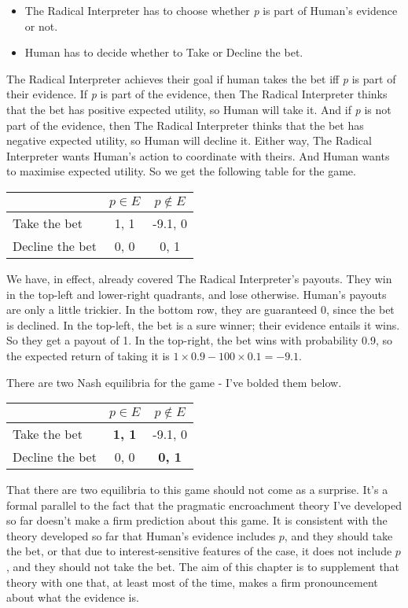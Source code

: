 \documentclass[11pt,]{book}
\providecommand{\tightlist}{%
  \setlength{\itemsep}{0pt}\setlength{\parskip}{0pt}}
\def\toprule{}
\def\bottomrule{}
\def\midrule{}
\begin{document}
\begin{itemize}
\tightlist
\item
  The Radical Interpreter has to choose whether \emph{p} is part of Human's evidence or not.
\item
  Human has to decide whether to Take or Decline the bet.
\end{itemize}

The Radical Interpreter achieves their goal if human takes the bet iff \emph{p} is part of their evidence. If \emph{p} is part of the evidence, then The Radical Interpreter thinks that the bet has positive expected utility, so Human will take it. And if \emph{p} is not part of the evidence, then The Radical Interpreter thinks that the bet has negative expected utility, so Human will decline it. Either way, The Radical Interpreter wants Human's action to coordinate with theirs. And Human wants to maximise expected utility. So we get the following table for the game.

\begin{longtable}[]{@{}lcc@{}}
\toprule
& \(p \in E\) & \(p \notin E\)\tabularnewline
\midrule
\endhead
Take the bet & 1, 1 & -9.1, 0\tabularnewline
Decline the bet & 0, 0 & 0, 1\tabularnewline
\bottomrule
\end{longtable}

We have, in effect, already covered The Radical Interpreter's payouts. They win in the top-left and lower-right quadrants, and lose otherwise. Human's payouts are only a little trickier. In the bottom row, they are guaranteed 0, since the bet is declined. In the top-left, the bet is a sure winner; their evidence entails it wins. So they get a payout of 1. In the top-right, the bet wins with probability 0.9, so the expected return of taking it is \(1 \times 0.9 - 100 \times 0.1 = -9.1\).

There are two Nash equilibria for the game - I've bolded them below.

\begin{longtable}[]{@{}lcc@{}}
\toprule
& \(p \in E\) & \(p \notin E\)\tabularnewline
\midrule
\endhead
Take the bet & \textbf{1, 1} & -9.1, 0\tabularnewline
Decline the bet & 0, 0 & \textbf{0, 1}\tabularnewline
\bottomrule
\end{longtable}

That there are two equilibria to this game should not come as a surprise. It's a formal parallel to the fact that the pragmatic encroachment theory I've developed so far doesn't make a firm prediction about this game. It is consistent with the theory developed so far that Human's evidence includes \(p\), and they should take the bet, or that due to interest-sensitive features of the case, it does not include \(p\), and they should not take the bet. The aim of this chapter is to supplement that theory with one that, at least most of the time, makes a firm pronouncement about what the evidence is.
\end{document}
